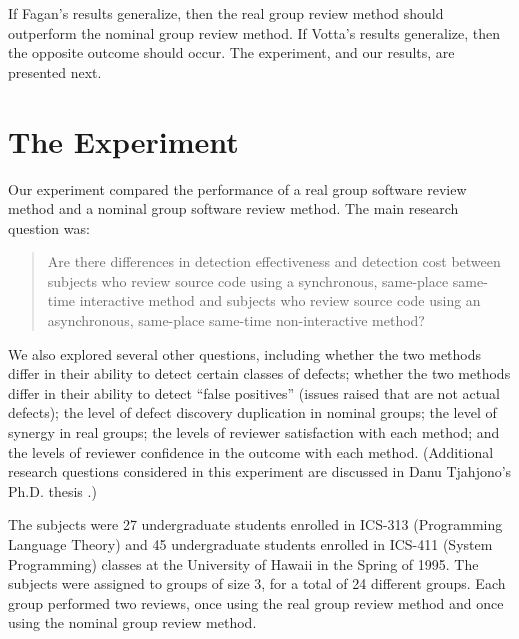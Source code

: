 If Fagan's results generalize, then the real group review method should
outperform the nominal group review method.  If Votta's results generalize,
then the opposite outcome should occur. The experiment, and our results,
are presented next.

\section{The Experiment}

Our experiment compared the performance of a real group software review
method and a nominal group software review method.  The main research
question was:

\begin{quotation}
  
  
  Are there differences in detection effectiveness and detection cost
  between subjects who review source code using a synchronous, same-place
  same-time interactive method and subjects who review source code using an
  asynchronous, same-place same-time non-interactive method?

\end{quotation}

We also explored several other questions, including whether the two
methods differ in their ability to detect certain classes of defects;
whether the two methods differ in their ability to detect ``false
positives'' (issues raised that are not actual defects); the level of
defect discovery duplication in nominal groups; the level of synergy in
real groups; the levels of reviewer satisfaction with each method; and the
levels of reviewer confidence in the outcome with each method.  (Additional
research questions considered in this experiment are discussed in Danu
Tjahjono's Ph.D. thesis \cite{csdl-95-08}.)

The subjects were 27 undergraduate students enrolled in ICS-313
(Programming Language Theory) and 45 undergraduate students enrolled in
ICS-411 (System Programming) classes at the University of Hawaii in the
Spring of 1995. The subjects were assigned to groups of size 3, for a total
of 24 different groups.  Each group performed two reviews, once using the
real group review method and once using the nominal group review method.

